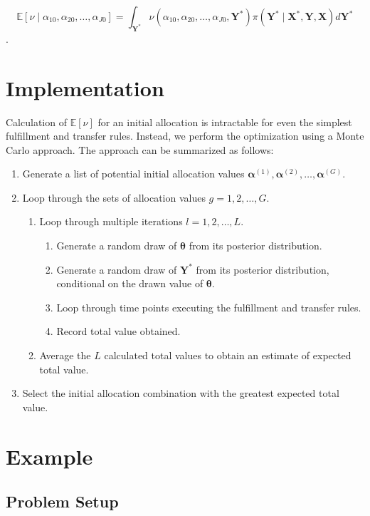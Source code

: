 \documentclass[11pt, oneside]{article}   	%
\begin{document}
$$\mathbb{E}[\nu \mid \alpha_{10}, \alpha_{20}, \ldots, \alpha_{J0}] = \int_{\mathbf{Y}^*} \nu(\alpha_{10}, \alpha_{20}, \ldots, \alpha_{J0}, \mathbf{Y}^*) \pi (\mathbf{Y}^* \mid \mathbf{X}^*, \mathbf{Y}, \mathbf{X}) d \mathbf{Y}^*$$.

\section{Implementation}

Calculation of $\mathbb{E}[\nu]$ for an initial allocation is intractable for even the simplest fulfillment and transfer rules.  Instead, we perform the optimization using a Monte Carlo approach.  The approach can be summarized as follows:

\begin{enumerate}
\item Generate a list of potential initial allocation values $\boldsymbol{\alpha}^{(1)}, \boldsymbol{\alpha}^{(2)}, \ldots, \boldsymbol{\alpha}^{(G)}$.
\item Loop through the sets of allocation values $g = 1, 2, \ldots, G$.
\begin{enumerate}
\item Loop through multiple iterations $l = 1, 2, \ldots, L$.
\begin{enumerate}
\item Generate a random draw of $\boldsymbol{\theta}$ from its posterior distribution.
\item Generate a random draw of $\mathbf{Y}^*$ from its posterior distribution, conditional on the drawn value of $\boldsymbol{\theta}$.
\item Loop through time points executing the fulfillment and transfer rules.
\item Record total value obtained.
\end{enumerate}
\item Average the $L$ calculated total values to obtain an estimate of expected total value.
\end{enumerate}
\item Select the initial allocation combination with the greatest expected total value.
\end{enumerate}

\section{Example}

\subsection{Problem Setup}
\end{document}
